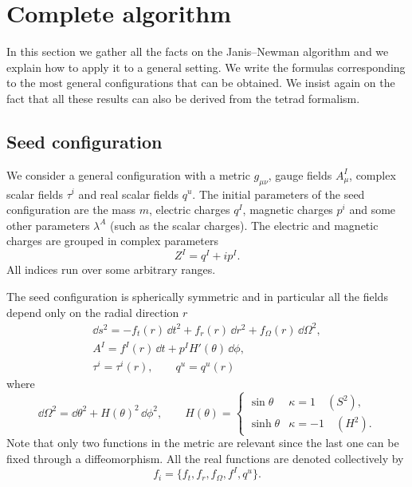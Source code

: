 \section{Complete algorithm}
\label{sec:general}


In this section we gather all the facts on the Janis--Newman algorithm and we explain how to apply it to a general setting.
We write the formulas corresponding to the most general configurations that can be obtained.
We insist again on the fact that all these results can also be derived from the tetrad formalism.


\subsection{Seed configuration}
\label{sec:general:seed}


We consider a general configuration with a metric $g_{\mu\nu}$, gauge fields $A_\mu^I$, complex scalar fields $\tau^i$ and real scalar fields $q^u$.
The initial parameters of the seed configuration are the mass $m$, electric charges $q^I$, magnetic charges $p^i$ and some other parameters $\lambda^A$ (such as the scalar charges).
The electric and magnetic charges are grouped in complex parameters
\begin{equation}
	Z^I = q^I + i p^I.
\end{equation} 
All indices run over some arbitrary ranges.

The seed configuration is spherically symmetric and in particular all the fields depend only on the radial direction $r$
\begin{subequations}
\label{gen:eq:static:tr}
\begin{gather}
	\label{gen:eq:static:metric:tr}
	\dd s^2 = - f_t(r)\, \dd t^2 + f_r(r)\, \dd r^2 + f_\Omega(r)\, \dd\Omega^2, \\
	A^I = f^I(r)\, \dd t + p^I H'(\theta)\, \dd\phi, \\
	\tau^i = \tau^i(r), \qquad
	q^u = q^u(r)
\end{gather}
\end{subequations}
where
\begin{equation}
	\dd \Omega^2 = \dd\theta^2 + H(\theta)^2\, \dd \phi^2, \qquad
	H(\theta) =
	\begin{cases}
		\sin \theta & \kappa = 1 \quad (S^2), \\
		\sinh \theta & \kappa = -1 \quad (H^2).
	\end{cases}
\end{equation} 
Note that only two functions in the metric are relevant since the last one can be fixed through a diffeomorphism.
All the real functions are denoted collectively by
\begin{equation}
	f_i = \{ f_t, f_r, f_\Omega, f^I, q^u \}.
\end{equation} 

